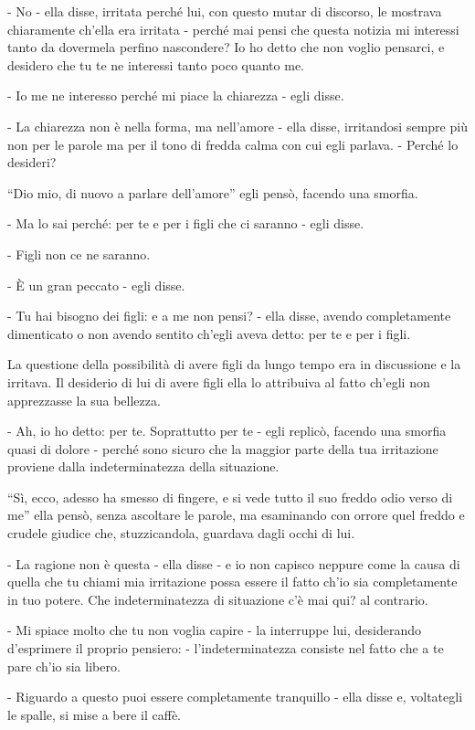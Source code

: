 - No - ella disse, irritata perché lui, con questo mutar di discorso, le mostrava chiaramente ch'ella era irritata - perché mai pensi che questa notizia mi interessi tanto da dovermela perfino nascondere? Io ho detto che non voglio pensarci, e desidero che tu te ne interessi tanto poco quanto me. 

- Io me ne interesso perché mi piace la chiarezza - egli disse. 

- La chiarezza non è nella forma, ma nell'amore - ella disse, irritandosi sempre più non per le parole ma per il tono di fredda calma con cui egli parlava. - Perché lo desideri? 

``Dio mio, di nuovo a parlare dell'amore'' egli pensò, facendo una smorfia. 

- Ma lo sai perché: per te e per i figli che ci saranno - egli disse. 

- Figli non ce ne saranno. 

- È un gran peccato - egli disse. 

- Tu hai bisogno dei figli: e a me non pensi? - ella disse, avendo completamente dimenticato o non avendo sentito ch'egli aveva detto: per te e per i figli. 

La questione della possibilità di avere figli da lungo tempo era in discussione e la irritava. Il desiderio di lui di avere figli ella lo attribuiva al fatto ch'egli non apprezzasse la sua bellezza. 

- Ah, io ho detto: per te. Soprattutto per te - egli replicò, facendo una smorfia quasi di dolore - perché sono sicuro che la maggior parte della tua irritazione proviene dalla indeterminatezza della situazione. 

``Sì, ecco, adesso ha smesso di fingere, e si vede tutto il suo freddo odio verso di me'' ella pensò, senza ascoltare le parole, ma esaminando con orrore quel freddo e crudele giudice che, stuzzicandola, guardava dagli occhi di lui. 

- La ragione non è questa - ella disse - e io non capisco neppure come la causa di quella che tu chiami mia irritazione possa essere il fatto ch'io sia completamente in tuo potere. Che indeterminatezza di situazione c'è mai qui? al contrario. 

- Mi spiace molto che tu non voglia capire - la interruppe lui, desiderando d'esprimere il proprio pensiero: - l'indeterminatezza consiste nel fatto che a te pare ch'io sia libero. 

- Riguardo a questo puoi essere completamente tranquillo - ella disse e, voltategli le spalle, si mise a bere il caffè. 

